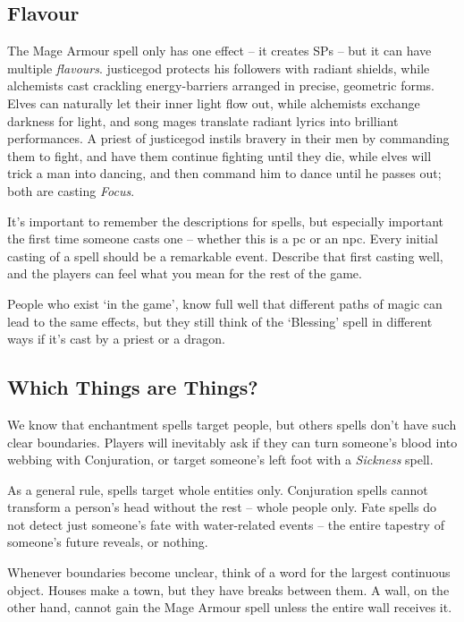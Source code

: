 \begin{multicols}{2}

\subsection{Flavour}

The Mage Armour spell only has one effect -- it creates \glspl{SP} -- but it can have multiple \textit{flavours}.
\Gls{justicegod} protects his followers with radiant shields, while alchemists cast crackling energy-barriers arranged in precise, geometric forms.
Elves can naturally let their inner light flow out, while alchemists exchange darkness for light, and song mages translate radiant lyrics into brilliant performances.
A priest of \gls{justicegod} instils bravery in their men by commanding them to fight, and have them continue fighting until they die, while elves will trick a man into dancing, and then command him to dance until he passes out; both are casting \textit{Focus}.

It's important to remember the descriptions for spells, but especially important the first time someone casts one -- whether this is a \gls{pc} or an \gls{npc}.
Every initial casting of a spell should be a remarkable event.
Describe that first casting well, and the players can feel what you mean for the rest of the game.

People who exist `in the game', know full well that different paths of magic can lead to the same effects, but they still think of the `Blessing' spell in different ways if it's cast by a priest or a dragon.

\subsection{Which Things are Things?}

We know that enchantment spells target people, but others spells don't have such clear boundaries.
Players will inevitably ask if they can turn someone's blood into webbing with Conjuration, or target someone's left foot with a \textit{Sickness} spell.

As a general rule, spells target whole entities only.
Conjuration spells cannot transform a person's head without the rest -- whole people only.
Fate spells do not detect just someone's fate with water-related events -- the entire tapestry of someone's future reveals, or nothing.

Whenever boundaries become unclear, think of a word for the largest continuous object.
Houses make a town, but they have breaks between them.
A wall, on the other hand, cannot gain the Mage Armour spell unless the entire wall receives it.


\end{multicols}
